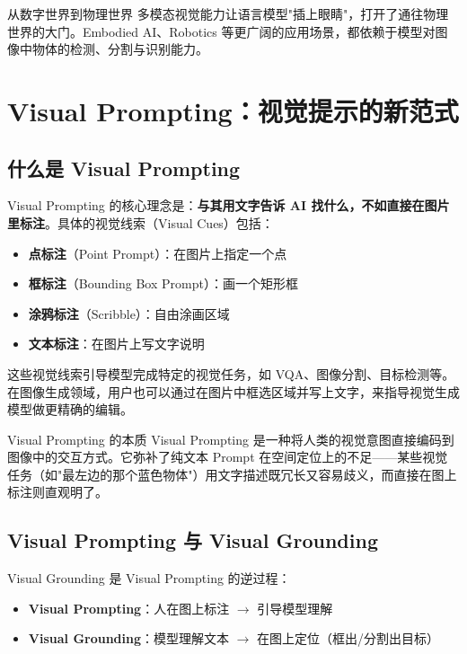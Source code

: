 \documentclass[a4paper]{article}
\begin{document}
\begin{knowledgebox}{从数字世界到物理世界}
多模态视觉能力让语言模型"插上眼睛"，打开了通往物理世界的大门。Embodied AI、Robotics 等更广阔的应用场景，都依赖于模型对图像中物体的检测、分割与识别能力。
\end{knowledgebox}

\section{Visual Prompting：视觉提示的新范式}

\subsection{什么是 Visual Prompting}

Visual Prompting 的核心理念是：\textbf{与其用文字告诉 AI 找什么，不如直接在图片里标注}。具体的视觉线索（Visual Cues）包括：

\begin{itemize}
    \item \textbf{点标注}（Point Prompt）：在图片上指定一个点
    \item \textbf{框标注}（Bounding Box Prompt）：画一个矩形框
    \item \textbf{涂鸦标注}（Scribble）：自由涂画区域
    \item \textbf{文本标注}：在图片上写文字说明
\end{itemize}

这些视觉线索引导模型完成特定的视觉任务，如 VQA、图像分割、目标检测等。在图像生成领域，用户也可以通过在图片中框选区域并写上文字，来指导视觉生成模型做更精确的编辑。

\begin{importantbox}{Visual Prompting 的本质}
Visual Prompting 是一种将人类的视觉意图直接编码到图像中的交互方式。它弥补了纯文本 Prompt 在空间定位上的不足——某些视觉任务（如"最左边的那个蓝色物体"）用文字描述既冗长又容易歧义，而直接在图上标注则直观明了。
\end{importantbox}

\subsection{Visual Prompting 与 Visual Grounding}

Visual Grounding 是 Visual Prompting 的逆过程：
\begin{itemize}
    \item \textbf{Visual Prompting}：人在图上标注 $\rightarrow$ 引导模型理解
    \item \textbf{Visual Grounding}：模型理解文本 $\rightarrow$ 在图上定位（框出/分割出目标）
\end{itemize}
\end{document}

